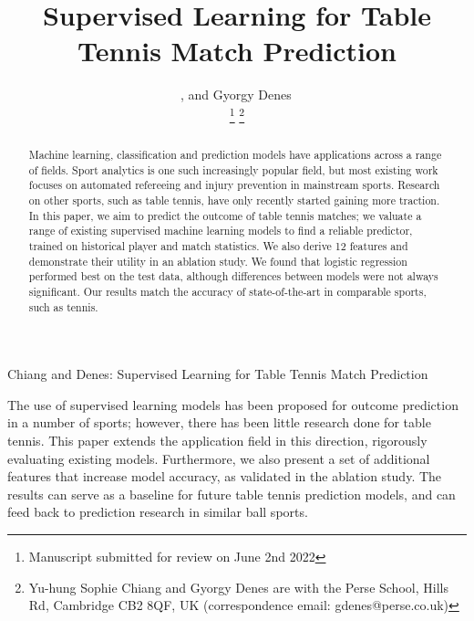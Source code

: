 \documentclass[journal]{IEEEtai}
\begin{document}
\title{Supervised Learning for Table Tennis Match Prediction}
\author{, and
    Gyorgy Denes\,

\thanks{Manuscript submitted for review on  June 2nd 2022} 
\thanks{Yu-hung Sophie Chiang and Gyorgy Denes are with the Perse School, Hills Rd, Cambridge CB2 8QF, UK (correspondence email: gdenes@perse.co.uk)}
}

{Chiang and Denes: Supervised Learning for Table Tennis Match Prediction}



\maketitle


\begin{abstract}
Machine learning, classification and prediction models have applications across a range of fields. Sport analytics is one such increasingly popular field, but most existing work focuses on automated refereeing and injury prevention in mainstream sports. 
Research on other sports, such as table tennis, have only recently started gaining more traction. In this paper, we aim to predict the outcome of table tennis matches; we valuate a range of existing supervised machine learning models to find a reliable predictor, trained on historical player and  match statistics. We also derive 12 features and demonstrate their utility in an ablation study. We found that  logistic regression performed best on the test data, although differences between models were not always significant.  Our results match the accuracy of state-of-the-art in comparable sports, such as tennis.
\end{abstract}

\begin{IEEEImpStatement}
The use of supervised learning models has been proposed for outcome prediction in a number of sports; however, there has been little research done for table tennis. This paper extends the application field in this direction, rigorously evaluating existing models. Furthermore, we also present a set of additional features that increase model accuracy, as validated in the ablation study. The results can serve as a baseline for future table tennis prediction models, and can feed back to prediction research in similar ball sports.
\end{IEEEImpStatement}
\end{document}
